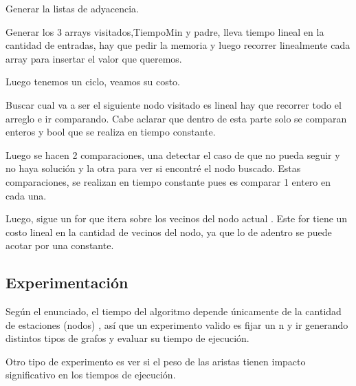 Generar la listas de adyacencia.

Generar los 3 arrays visitados,TiempoMin y padre, lleva tiempo lineal en la cantidad de entradas, hay que pedir la memoria y luego recorrer linealmente cada array para insertar el valor que queremos.

Luego tenemos un ciclo,  veamos su costo.

Buscar cual va a ser el siguiente nodo visitado es lineal hay que recorrer todo el arreglo e ir comparando. Cabe aclarar que dentro de esta parte solo se comparan enteros y bool que se realiza en tiempo constante.

Luego se hacen 2 comparaciones, una detectar el caso de que no pueda seguir y no haya solución y la otra para ver si encontré el nodo buscado. Estas comparaciones, se realizan en tiempo constante pues es comparar 1 entero en cada una.

Luego,  sigue un for que itera sobre los vecinos del nodo actual . Este for tiene un costo lineal en la cantidad de vecinos del nodo, ya que lo de adentro se puede acotar por una constante.


\subsection{Experimentación}
Según el enunciado, el tiempo del algoritmo depende únicamente de la cantidad de estaciones  (nodos) , así que un experimento valido es fijar un n y ir generando distintos tipos de grafos y evaluar su tiempo de ejecución.

Otro tipo de experimento es ver si el peso de las aristas tienen impacto significativo en los tiempos de ejecución.

